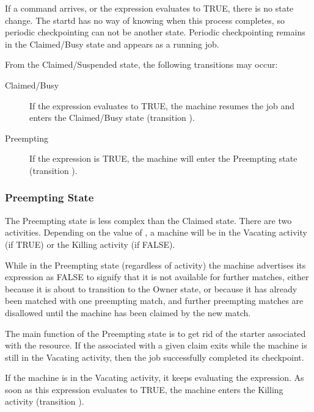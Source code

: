 If a  command arrives,
or the  expression evaluates to TRUE,
there is no state change.
The startd has no way of knowing when this process completes,
so periodic checkpointing can not be another state.
Periodic checkpointing remains in the Claimed/Busy state
and appears as a running job.

From the Claimed/Suspended state, the following transitions
may occur:

\begin{description}
  
\item[Claimed/Busy] If the  expression evaluates to
  TRUE, the machine resumes the job and enters the
  Claimed/Busy state (transition ).

\item[Preempting] If the  expression is TRUE, the machine
  will enter the Preempting state (transition ).

\end{description}

\subsubsection{\label{sec:Preempting-State}Preempting State}

The Preempting state is less complex than the Claimed state.
There are two activities.
Depending on the value of , a machine will
be in the
Vacating activity (if TRUE) or the Killing activity (if FALSE).  

While in the Preempting state (regardless of activity) the machine
advertises its  expression as FALSE to signify that
it is not available for further matches, either because it is about to
transition
to the Owner state, or because it has already been matched with
one preempting match, and further preempting matches are disallowed
until the machine has been claimed by the new match.

The main function of the Preempting state is to get rid of the starter
associated with the resource.
If the  associated
with a given claim exits while the machine is still in the Vacating
activity, then the job successfully completed its checkpoint.

If the machine is in the Vacating activity, it keeps evaluating the 
 expression.
As soon as this expression evaluates to TRUE,
the machine enters the Killing activity (transition ).

